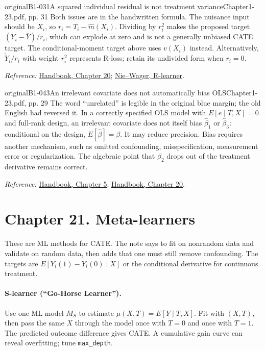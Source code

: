 {\begin{reviewnote}{original}{B1-031}{A squared individual residual is not treatment variance}{Chapter1-23.pdf, pp. 31}
Both issues are in the handwritten formula. The nuisance input should be $X_i$, so $r_i=T_i-\hat m(X_i)$. Dividing by $r_i^2$ makes the proposed target $(Y_i-\bar Y)/r_i$, which can explode at zero and is not a generally unbiased CATE target. The conditional-moment target above uses $v(X_i)$ instead. Alternatively, $\widetilde Y_i/r_i$ with weight $r_i^2$ represents R-loss; retain its undivided form when $r_i=0$.
\par\smallskip\textit{Reference:} \href{https://matheusfacure.github.io/python-causality-handbook/20-Plug-and-Play-Estimators.html}{Handbook, Chapter 20}; \href{https://arxiv.org/abs/1712.04912}{Nie--Wager, R-learner}.
\end{reviewnote}
\begin{reviewnote}{original}{B1-043}{An irrelevant covariate does not automatically bias OLS}{Chapter1-23.pdf, pp. 29}
The word ``unrelated'' is legible in the original blue margin; the old English had reversed it. In a correctly specified OLS model with $E[e\mid T,X]=0$ and full-rank design, an irrelevant covariate does not itself bias $\hat\beta_1$ or $\hat\beta_3$: conditional on the design, $E[\hat\beta]=\beta$. It may reduce precision. Bias requires another mechanism, such as omitted confounding, misspecification, measurement error or regularization. The algebraic point that $\beta_2$ drops out of the treatment derivative remains correct.
\par\smallskip\textit{Reference:} \href{https://matheusfacure.github.io/python-causality-handbook/05-The-Unreasonable-Effectiveness-of-Linear-Regression.html}{Handbook, Chapter 5}; \href{https://matheusfacure.github.io/python-causality-handbook/20-Plug-and-Play-Estimators.html}{Handbook, Chapter 20}.
\end{reviewnote}

\section{Chapter 21. Meta-learners}
These are ML methods for CATE. The note says to fit on nonrandom data and validate on random data, then adds that one must still remove confounding. The targets are $E[Y_i(1)-Y_i(0)\mid X]$ or the conditional derivative for continuous treatment.

\paragraph{S-learner (``Go-Horse Learner'').}
Use one ML model $M_S$ to estimate $\mu(X,T)=E[Y\mid T,X]$. Fit with $(X,T)$, then pass the same $X$ through the model once with $T=0$ and once with $T=1$. The predicted outcome difference gives CATE. A cumulative gain curve can reveal overfitting; tune \texttt{max\_depth}.

}

